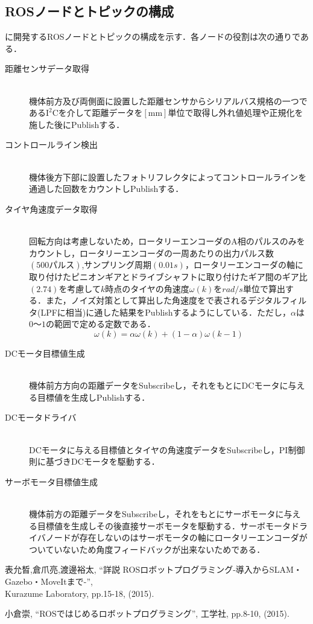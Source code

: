 \documentclass[10pt,a4j]{jarticle}
\begin{document}
\newpage
\subsection{ROSノードとトピックの構成}
に開発するROSノードとトピックの構成を示す．各ノードの役割は次の通りである．
\begin{description}

    \item[距離センサデータ取得] \mbox{} \\
      機体前方及び両側面に設置した距離センサからシリアルバス規格の一つである$\mathrm{I^2C}$を介して距離データを$\mathrm{[mm]}$単位で取得し外れ値処理や正規化を施した後にPublishする．
    \item[コントロールライン検出] \mbox{} \\
      機体後方下部に設置したフォトリフレクタによってコントロールラインを通過した回数をカウントしPublishする．

    \item[タイヤ角速度データ取得] \mbox{} \\
      回転方向は考慮しないため，ロータリーエンコーダのA相のパルスのみをカウントし，ロータリーエンコーダの一周あたりの出力パルス数$(500パルス)$,サンプリング周期$(0.01\unit{s})$，ロータリーエンコーダの軸に取り付けたピニオンギアとドライブシャフトに取り付けたギア間のギア比$(2.74)$を考慮して$k$時点のタイヤの角速度$\omega(k)$を$\unit{rad/s}$単位で算出する．また，ノイズ対策として算出した角速度をで表されるデジタルフィルタ(LPFに相当)に通した結果をPublishするようにしている．ただし，$\alpha$は$0〜1$の範囲で定める定数である．\\
      \begin{equation}
      	\omega(k)=\alpha\omega(k)+(1-\alpha)\omega(k-1)\label{eq::lpf}
      \end{equation}

    \item[DCモータ目標値生成] \mbox{} \\
      機体前方方向の距離データをSubscribeし，それをもとにDCモータに与える目標値を生成しPublishする．

    \item[DCモータドライバ] \mbox{} \\
      DCモータに与える目標値とタイヤの角速度データをSubscribeし，PI制御則に基づきDCモータを駆動する．

    \item[サーボモータ目標値生成] \mbox{} \\
      機体前方の距離データをSubscribeし，それをもとにサーボモータに与える目標値を生成しその後直接サーボモータを駆動する．サーボモータドライバノードが存在しないのはサーボモータの軸にロータリーエンコーダがついていないため角度フィードバックが出来ないためである．

  \end{description}

\begin{thebibliography}{9}
    表允晳,倉爪亮,渡邊裕太, ``詳説 ROSロボットプログラミング-導入からSLAM・Gazebo・MoveItまで-'', \\
    Kurazume Laboratory, pp.15-18, (2015).

    小倉崇, ``ROSではじめるロボットプログラミング'', 工学社, pp.8-10, (2015).
    
\end{thebibliography}
\end{document}
